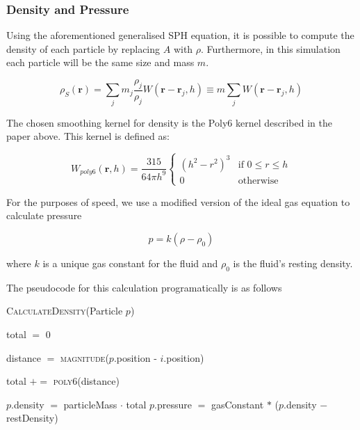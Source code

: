 \documentclass[12pt]{article}
\begin{document}
    \subsubsection{Density and Pressure}

    Using the aforementioned generalised SPH equation, it is possible to compute the density of each particle by replacing $A$ with $\rho$. Furthermore, in this simulation each particle will be the same size and mass $m$.

    \begin{equation}
        \rho_S(\textbf{r}) = \sum_{j}{m_j \frac{\rho_j}{\rho_j}W(\textbf{r} - \textbf{r}_j, h)} \equiv m\sum_{j}{W(\textbf{r} - \textbf{r}_j, h)}
    \end{equation}

    The chosen smoothing kernel for density is the Poly6 kernel described in the paper above\cite{sca}. This kernel is defined as:

    \begin{equation}
        W_{poly6}(\textbf{r}, h) = \frac{315}{64\pi{h}^9}
        \begin{cases}
            (h^2 - r^2)^3 & \text{if } 0 \leq r \leq h \\
            0 & \text{otherwise}
        \end{cases}
    \end{equation}

    For the purposes of speed, we use a modified version of the ideal gas equation to calculate pressure

    \begin{equation}
        p = k(\rho - \rho_0)
    \end{equation}

    where $k$ is a unique gas constant for the fluid and $\rho_0$ is the fluid's resting density.

    The pseudocode for this calculation programatically is as follows

    \begin{algorithm}[H]
        \caption{\textsc{CalculateDensity}(Particle $p$)}
    
        \begin{algorithmic}[1]
            \State total $=$ 0
            
                \State distance $=$ \textsc{magnitude}($p$.position - $i$.position)

                    \State total $+=$ \textsc{poly6}(distance)
                \EndIf
            \EndFor

            \State $p$.density $=$ particleMass $\cdot$ total
            \State $p$.pressure $=$ gasConstant $*$ ($p$.density $-$ restDensity)
        \end{algorithmic}

    \end{algorithm}
\end{document}
